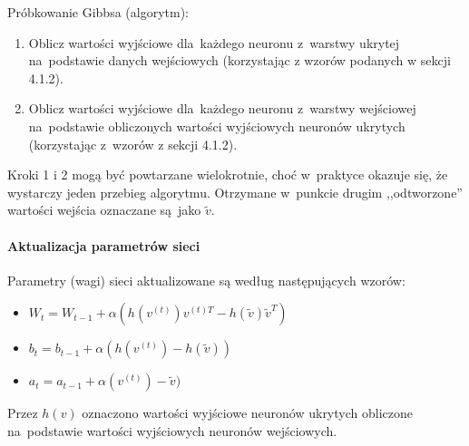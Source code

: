 Próbkowanie Gibbsa (algorytm):
\begin{enumerate}
  \item Oblicz wartości wyjściowe dla~każdego neuronu z~warstwy ukrytej na~podstawie danych wejściowych
  (korzystając z wzorów podanych w sekcji 4.1.2).
  \item Oblicz wartości wyjściowe dla~każdego neuronu z~warstwy wejściowej na~podstawie obliczonych wartości
  wyjściowych neuronów ukrytych (korzystając z~wzorów z sekcji 4.1.2).
\end{enumerate}

Kroki 1 i 2 mogą być powtarzane wielokrotnie, choć w~praktyce okazuje się, że wystarczy jeden
przebieg algorytmu. Otrzymane w~punkcie drugim ,,odtworzone'' wartości wejścia oznaczane są~jako $\tilde{v}$.

\paragraph{Aktualizacja parametrów sieci}
Parametry (wagi) sieci aktualizowane są według następujących wzorów:
\begin{itemize}
  \item $W_t=W_{t-1}+\alpha(h(v^{(t)})v^{(t)T}-h(\tilde{v})\tilde{v}^{T})$
  \item $b_t=b_{t-1}+\alpha(h(v^{(t)})-h(\tilde{v}))$
  \item $a_t=a_{t-1}+\alpha(v^{(t)})-\tilde{v})$
\end{itemize}
\vspace{1cm}

Przez $h(v)$ oznaczono wartości wyjściowe neuronów ukrytych obliczone na~podstawie wartości wyjściowych
neuronów wejściowych.
